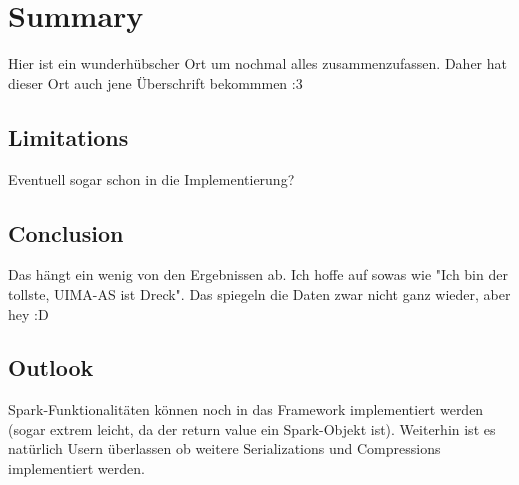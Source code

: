 \chapter{Summary}\label{ch:summary}

Hier ist ein wunderhübscher Ort um nochmal alles zusammenzufassen. Daher hat dieser Ort auch jene Überschrift bekommmen :3

\section{Limitations}
Eventuell sogar schon in die Implementierung?

\section{Conclusion}

Das hängt ein wenig von den Ergebnissen ab. Ich hoffe auf sowas wie "Ich bin der tollste, UIMA-AS ist Dreck". Das spiegeln die Daten zwar nicht ganz wieder, aber hey :D

\section{Outlook}

Spark-Funktionalitäten können noch in das Framework implementiert werden (sogar extrem leicht, da der return value ein Spark-Objekt ist). Weiterhin ist es natürlich Usern überlassen ob weitere Serializations und Compressions implementiert werden.